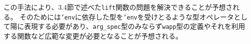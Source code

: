 \documentclass[uplatex]{sumiilab-paper}
\theoremstyle{mystyle}
\numberwithin{definition}{chapter} %
\begin{document}






この手法により、3.4節で述べた{\tt lift}関数の問題を解決できることが予想される。
そのためには{\tt 'env}に依存した型を{\tt 'env}を受けとるような型オペレータとして陽に表現する必要があり、{\tt arg\_spec}型のみならず{\tt wapp}型の定義やそれを利用する関数など広範な変更が必要となることが予想される。
\end{document}
